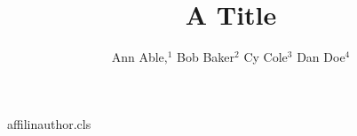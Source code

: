 \begin{filecontents*}[overwrite]{affilinauthor.cls}
\def\affilfont{\small}
\def\affil#1{\par{\reset@font\affilfont#1\par}}
\def\address#1{\par{\reset@font\affilfont#1\par}}
\def\@maketitle{\newpage{\Large\bfseries\@title\par}\vskip1em\noindent{\bfseries\@author\par}\vskip1em}
\end{filecontents*}
\documentclass{affilinauthor}

\title{A Title}
\author{Ann Able,$^1$ Bob Baker$^2$ Cy Cole$^3$ Dan Doe$^4$
}
\maketitle
Body.

